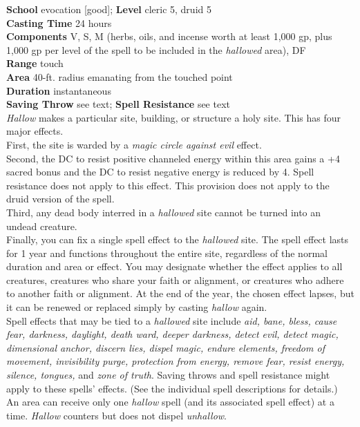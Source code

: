 \textbf{School} evocation [good]; \textbf{Level} cleric 5, druid 5\\
\textbf{Casting Time} 24 hours\\
\textbf{Components} V, S, M (herbs, oils, and incense worth at least 1,000 gp, plus 1,000 gp per level of the spell to be included in the \textit{hallowed }area), DF\\
\textbf{Range} touch\\
\textbf{Area} 40-ft. radius emanating from the touched point\\
\textbf{Duration} instantaneous\\
\textbf{Saving Throw} see text; \textbf{Spell Resistance} see text\\
\textit{Hallow }makes a particular site, building, or structure a holy site. This has four major effects.\\
First, the site is warded by a \textit{magic circle against evil }effect.\\
Second, the DC to resist positive channeled energy within this area gains a +4 sacred bonus and the DC to resist negative energy is reduced by 4. Spell resistance does not apply to this effect. This provision does not apply to the druid version of the spell.\\
Third, any dead body interred in a \textit{hallowed }site cannot be turned into an undead creature.\\
Finally, you can fix a single spell effect to the \textit{hallowed }site. The spell effect lasts for 1 year and functions throughout the entire site, regardless of the normal duration and area or effect. You may designate whether the effect applies to all creatures, creatures who share your faith or alignment, or creatures who adhere to another faith or alignment. At the end of the year, the chosen effect lapses, but it can be renewed or replaced simply by casting \textit{hallow }again.\\
Spell effects that may be tied to a \textit{hallowed }site include \textit{aid, bane, bless, cause fear, darkness, daylight, death ward, deeper darkness, detect evil, detect magic, dimensional anchor, discern lies, dispel magic, endure elements, freedom of movement, invisibility purge, protection from energy, remove fear, resist energy, silence, tongues, }and \textit{zone of truth}. Saving throws and spell resistance might apply to these spells' effects. (See the individual spell descriptions for details.)\\
An area can receive only one \textit{hallow }spell (and its associated spell effect) at a time. \textit{Hallow }counters but does not dispel \textit{unhallow}.\\
